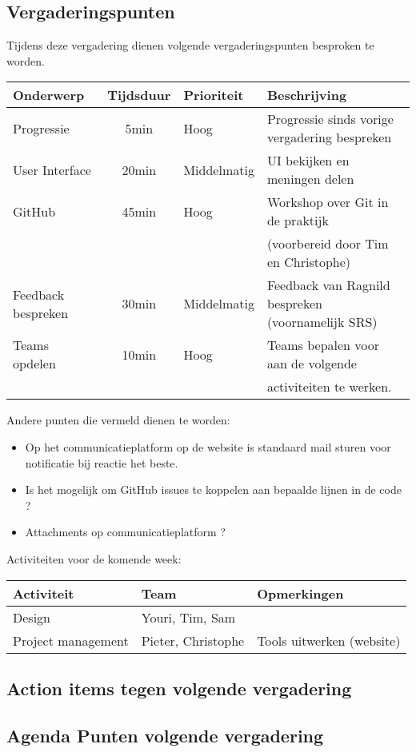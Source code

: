 \subsection{Vergaderingspunten}
Tijdens deze vergadering dienen volgende vergaderingspunten besproken te worden.
\begin{table} [H]
	\centering
	\begin{tabular} {l|cll}
		\textbf{Onderwerp} & \textbf{Tijdsduur} & \textbf{Prioriteit} & \textbf{Beschrijving} \\ %
		\hline
		Progressie & 5min & Hoog & Progressie sinds vorige vergadering bespreken \\
		User Interface & 20min & Middelmatig & UI bekijken en meningen delen \\
		GitHub	& 45min & Hoog & Workshop over Git in de praktijk \\
				& 		& 		& (voorbereid door Tim en Christophe) \\
		Feedback bespreken & 30min & Middelmatig & Feedback van Ragnild bespreken (voornamelijk SRS) \\
		Teams opdelen & 10min & Hoog & Teams bepalen voor aan de volgende \\
						& 		&  & activiteiten te werken.
	\end{tabular}
\end{table}
Andere punten die vermeld dienen te worden:
\begin{itemize}
	\item
		Op het communicatieplatform op de website is standaard mail sturen voor notificatie bij reactie het beste.
	\item
		Is het mogelijk om GitHub issues te koppelen aan bepaalde lijnen in de code ?
	\item
		Attachments op communicatieplatform ?
\end{itemize}
Activiteiten voor de komende week:
\begin{table} [H]
	\centering
	\begin{tabular} {l|ll}
		\textbf{Activiteit} & \textbf{Team} & \textbf{Opmerkingen} \\
		\hline
		Design & Youri, Tim, Sam & \\
		Project management & Pieter, Christophe & Tools uitwerken (website) \\
		 
	\end{tabular}
\end{table}
\subsection{Action items tegen volgende vergadering}
\subsection{Agenda Punten volgende vergadering}

